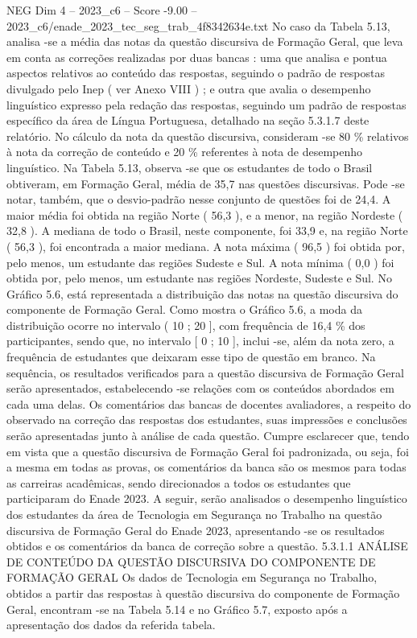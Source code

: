 \begin{textsample}{NEG Dim 4 – 2023\_c6 – Score -9.00 – 2023\_c6/enade\_2023\_tec\_seg\_trab\_4f8342634e.txt}
No caso da Tabela 5.13, analisa -se a média das notas da questão discursiva de Formação Geral, que leva em conta as correções realizadas por duas bancas : uma que analisa e pontua aspectos relativos ao conteúdo das respostas, seguindo o padrão de respostas divulgado pelo Inep ( ver Anexo VIII ) ; e outra que avalia o desempenho linguístico expresso pela redação das respostas, seguindo um padrão de respostas específico da área de Língua Portuguesa, detalhado na seção 5.3.1.7 deste relatório.
No cálculo da nota da questão discursiva, consideram -se 80 \% relativos à nota da correção de conteúdo e 20 \% referentes à nota de desempenho linguístico.
Na Tabela 5.13, observa -se que os estudantes de todo o Brasil obtiveram, em Formação Geral, média de 35,7 nas questões discursivas.
Pode -se notar, também, que o desvio-padrão nesse conjunto de questões foi de 24,4.
A maior média foi obtida na região Norte ( 56,3 ), e a menor, na região Nordeste ( 32,8 ).
A mediana de todo o Brasil, neste componente, foi 33,9 e, na região Norte ( 56,3 ), foi encontrada a maior mediana.
A nota máxima ( 96,5 ) foi obtida por, pelo menos, um estudante das regiões Sudeste e Sul.
A nota mínima ( 0,0 ) foi obtida por, pelo menos, um estudante nas regiões Nordeste, Sudeste e Sul.
No Gráfico 5.6, está representada a distribuição das notas na questão discursiva do componente de Formação Geral.
Como mostra o Gráfico 5.6, a moda da distribuição ocorre no intervalo ( 10 ; 20 ], com frequência de 16,4 \% dos participantes, sendo que, no intervalo [ 0 ; 10 ], inclui -se, além da nota zero, a frequência de estudantes que deixaram esse tipo de questão em branco.
Na sequência, os resultados verificados para a questão discursiva de Formação Geral serão apresentados, estabelecendo -se relações com os conteúdos abordados em cada uma delas.
Os comentários das bancas de docentes avaliadores, a respeito do observado na correção das respostas dos estudantes, suas impressões e conclusões serão apresentadas junto à análise de cada questão.
Cumpre esclarecer que, tendo em vista que a questão discursiva de Formação Geral foi padronizada, ou seja, foi a mesma em todas as provas, os comentários da banca são os mesmos para todas as carreiras acadêmicas, sendo direcionados a todos os estudantes que participaram do Enade 2023.
A seguir, serão analisados o desempenho linguístico dos estudantes da área de Tecnologia em Segurança no Trabalho na questão discursiva de Formação Geral do Enade 2023, apresentando -se os resultados obtidos e os comentários da banca de correção sobre a questão. 5.3.1.1 ANÁLISE DE CONTEÚDO DA QUESTÃO DISCURSIVA DO COMPONENTE DE FORMAÇÃO GERAL Os dados de Tecnologia em Segurança no Trabalho, obtidos a partir das respostas à questão discursiva do componente de Formação Geral, encontram -se na Tabela 5.14 e no Gráfico 5.7, exposto após a apresentação dos dados da referida tabela.

\end{textsample}
